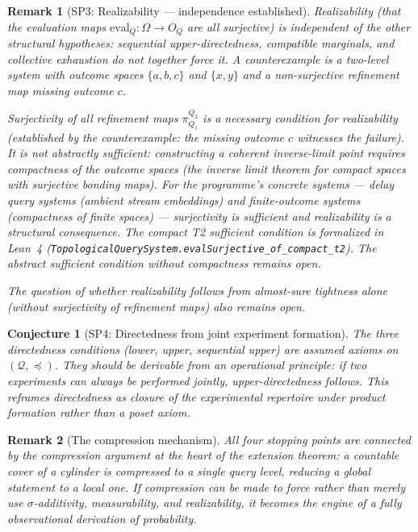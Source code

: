 \documentclass[11pt]{article}
\newtheorem{remark}{Remark}
\newtheorem{conjecture}{Conjecture}
\begin{document}
\begin{remark}[SP3: Realizability --- independence established]
Realizability (that the evaluation maps $\mathrm{eval}_Q : \Omega \to O_Q$ are
all surjective) is independent of the other structural hypotheses: sequential
upper-directedness, compatible marginals, and collective exhaustion do not
together force it.  A counterexample is a two-level system with outcome spaces
$\{a,b,c\}$ and $\{x,y\}$ and a non-surjective refinement map missing outcome $c$.

Surjectivity of all refinement maps $\pi^{Q_2}_{Q_1}$ is a \emph{necessary} condition
for realizability (established by the counterexample: the missing outcome $c$ witnesses
the failure).  It is not abstractly sufficient: constructing a coherent inverse-limit
point requires compactness of the outcome spaces (the inverse limit theorem for compact
spaces with surjective bonding maps).  For the programme's concrete systems ---
delay query systems (ambient stream embeddings) and finite-outcome systems (compactness
of finite spaces) --- surjectivity is sufficient and realizability is a structural
consequence.  The compact T2 sufficient condition is formalized in Lean~4
(\texttt{TopologicalQuerySystem.evalSurjective\_of\_compact\_t2}).
The abstract sufficient condition without compactness remains open.

The question of whether realizability follows from almost-sure tightness alone
(without surjectivity of refinement maps) also remains open.
\end{remark}

\begin{conjecture}[SP4: Directedness from joint experiment formation]
The three directedness conditions (lower, upper, sequential upper) are
assumed axioms on $(\mathcal Q,\preceq)$.  They should be derivable
from an operational principle: if two experiments can always be
performed jointly, upper-directedness follows.  This reframes
directedness as closure of the experimental repertoire under product
formation rather than a poset axiom.
\end{conjecture}

\begin{remark}[The compression mechanism]
All four stopping points are connected by the compression argument at
the heart of the extension theorem: a countable cover of a cylinder is
compressed to a single query level, reducing a global statement to a
local one.  If compression can be made to force rather than merely use
$\sigma$-additivity, measurability, and realizability, it becomes the
engine of a fully observational derivation of probability.
\end{remark}
\end{document}
